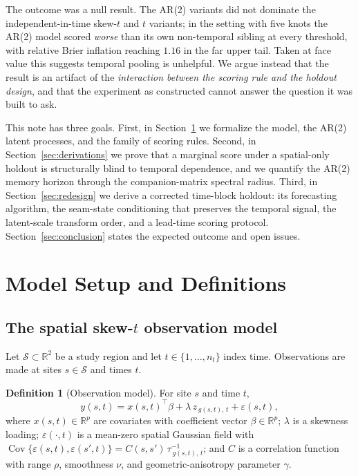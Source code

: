 \documentclass[11pt]{article}
\theoremstyle{definition}
\newtheorem{definition}{Definition}
\theoremstyle{remark}
\newcommand{\R}{\mathbb{R}}
\newcommand{\Cov}{\operatorname{Cov}}
\begin{document}
The outcome was a null result. The AR(2) variants did not dominate the
independent-in-time skew-$t$ and $t$ variants; in the setting with five
knots the AR(2) model scored \emph{worse} than its own non-temporal
sibling at every threshold, with relative Brier inflation reaching
$1.16$ in the far upper tail. Taken at face value this suggests
temporal pooling is unhelpful. We argue instead that the result is an
artifact of the \emph{interaction between the scoring rule and the
holdout design}, and that the experiment as constructed cannot answer
the question it was built to ask.

This note has three goals. First, in Section~\ref{sec:setup} we
formalize the model, the AR(2) latent processes, and the family of
scoring rules. Second, in Section~\ref{sec:derivations} we prove that a
marginal score under a spatial-only holdout is structurally blind to
temporal dependence, and we quantify the AR(2) memory horizon through
the companion-matrix spectral radius. Third, in
Section~\ref{sec:redesign} we derive a corrected time-block holdout:
its forecasting algorithm, the seam-state conditioning that preserves
the temporal signal, the latent-scale transform order, and a
lead-time scoring protocol. Section~\ref{sec:conclusion} states the
expected outcome and open issues.

\section{Model Setup and Definitions}
\label{sec:setup}

\subsection{The spatial skew-$t$ observation model}

Let $\mathcal{S} \subset \R^2$ be a study region and let
$t \in \{1,\dots,n_t\}$ index time. Observations are made at sites
$s \in \mathcal{S}$ and times $t$.

\begin{definition}[Observation model]
\label{def:obs}
For site $s$ and time $t$,
\begin{equation}
  y(s,t)
  = x(s,t)^\top \beta
  + \lambda\, z_{\,g(s,t),\,t}
  + \varepsilon(s,t),
  \label{eq:obs}
\end{equation}
where $x(s,t)\in\R^p$ are covariates with coefficient vector
$\beta\in\R^p$; $\lambda$ is a skewness loading;
$\varepsilon(\cdot,t)$ is a mean-zero spatial Gaussian field with
$\Cov\{\varepsilon(s,t),\varepsilon(s',t)\}
= C(s,s')\,\tau_{\,g(s,t),\,t}^{-1}$;
and $C$ is a correlation function with range $\rho$, smoothness $\nu$,
and geometric-anisotropy parameter $\gamma$.
\end{definition}
\end{document}
